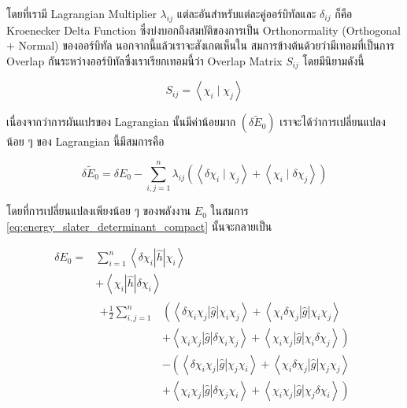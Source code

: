 \noindent โดยที่เรามี Lagrangian Multiplier $\lambda_{i j}$ แต่ละอันสำหรับแต่ละคู่ออร์บิทัลและ $\delta_{i j}$ ก็คือ Kroenecker
Delta Function ซึ่งบ่งบอกถึงสมบัติของการเป็น Orthonormality (Orthogonal + Normal) ของออร์บิทัล นอกจากนี้แล้วเราจะสังเกตเห็นใน%
สมการข้างต้นด้วยว่ามีเทอมที่เป็นการ Overlap กันระหว่างออร์บิทัลซึ่งเราเรียกเทอมนี้ว่า Overlap Matrix $S_{i j}$ โดยมีนิยามดังนี้

\begin{equation}
    S_{i j}
    =
    \left\langle\chi_i \mid \chi_j\right\rangle
\end{equation}

\noindent เนื่องจากว่าการผันแปรของ Lagrangian นั้นมีค่าน้อยมาก $(\delta \tilde{E}_0)$ เราจะได้ว่าการเปลี่ยนแปลงน้อย ๆ ของ
Lagrangian นี้มีสมการคือ

\begin{equation}
    \label{eq:small_variation_energy_1}
    \delta \tilde{E}_0
    = \delta E_0
    - \sum_{i, j=1}^n \lambda_{i j}
    \left(
    \left\langle\delta \chi_i \mid \chi_j\right\rangle
    + \left\langle\chi_i \mid \delta \chi_j\right\rangle
    \right)
\end{equation}

\noindent โดยที่การเปลี่ยนแปลงเพียงน้อย ๆ ของพลังงาน $E_0$ ในสมการ \eqref{eq:energy_slater_determinant_compact}
นั้นจะกลายเป็น

\begin{equation}
    \label{eq:small_variation_energy_2}
    \begin{aligned}
        \delta E_0
        = & \sum_{i=1}^n\left\langle\delta \chi_i|\hat{h}| \chi_i\right\rangle                     \\
          & +\left\langle\chi_i|\hat{h}| \delta \chi_i\right\rangle                                \\
          & \begin{aligned} +\frac{1}{2} \sum_{i, j=1}^n
                 & \left( \right. \left\langle\delta \chi_i \chi_j|\hat{g}| \chi_i \chi_j\right\rangle
                + \left\langle\chi_i \delta \chi_j|\hat{g}| \chi_i \chi_j\right\rangle                 \\
                 & +\left\langle\chi_i \chi_j|\hat{g}| \delta \chi_i \chi_j\right\rangle
                +\left\langle\chi_i \chi_j|\hat{g}| \chi_i \delta \chi_j\right\rangle \left. \right)   \\
                 & -\left(\left\langle\delta \chi_i \chi_j|\hat{g}| \chi_j \chi_i\right\rangle \right.
                + \left\langle\chi_i \delta \chi_j|\hat{g}| \chi_j \chi_j\right\rangle                 \\
                 & +\left\langle\chi_i \chi_j|\hat{g}| \delta \chi_j \chi_i\right\rangle
                + \left\langle\chi_i \chi_j|\hat{g}| \chi_j \delta \chi_i\right\rangle \left. \right)
            \end{aligned}
    \end{aligned}
\end{equation}

